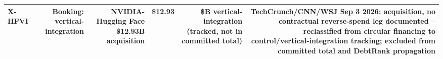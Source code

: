 \begin{tabular}{@{}lrrrrr@{}}
X-HFVI & Booking: vertical-integration & NVIDIA-Hugging Face \$12.93B acquisition & \$12.93 & \$B vertical-integration (tracked, not in committed total) & TechCrunch/CNN/WSJ Sep 3 2026: acquisition, no contractual reverse-spend leg documented -- reclassified from circular financing to control/vertical-integration tracking; excluded from committed total and DebtRank propagation \\
\bottomrule
\end{tabular}